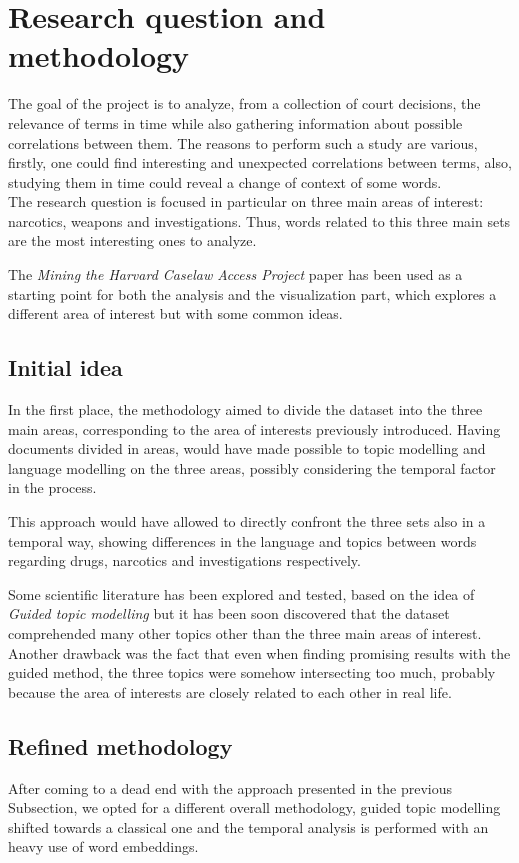 \section{Research question and methodology}

The goal of the project is to analyze, from a collection 
of court decisions, the relevance of terms in time while 
also gathering information about possible correlations between 
them. The reasons to perform such a study are various, firstly, 
one could find interesting and unexpected correlations between terms, 
also, studying them in time could reveal a change of 
context of some words.\\
The research question is focused in particular on three main areas of interest:
narcotics, weapons and investigations. Thus, words related to this three main sets
are the most interesting ones to analyze.

The \emph{Mining the Harvard Caselaw Access Project} paper has been used as a starting point for
both the analysis and the visualization part, which explores a different area of interest but with some common ideas.~\cite{harvard_caselaw}

\subsection{Initial idea}
\label{res-med}
In the first place, the methodology aimed to divide the dataset into the three main areas, 
corresponding to the area of interests previously introduced. 
Having documents divided in areas, would have made possible to topic modelling and language modelling on the three areas, possibly considering the temporal factor in the process. 

This approach would have allowed to directly confront the three sets also in a temporal way, showing differences in the language and topics between words regarding drugs, narcotics and investigations respectively.

\noindent Some scientific literature has been explored and tested, based on the idea of \emph{Guided topic modelling} 
but it has been soon discovered that the dataset comprehended many other topics other than the
three main areas of interest.~\cite{glda} Another drawback was the fact that even when finding promising results 
with the guided method, the three topics were somehow intersecting too much, probably because the 
area of interests are closely related to each other in real life.

\subsection{Refined methodology}

After coming to a dead end with the approach presented in the previous Subsection, we opted for a different
overall methodology, guided topic modelling shifted towards a classical one and the temporal 
analysis is performed with an heavy use of word embeddings.  